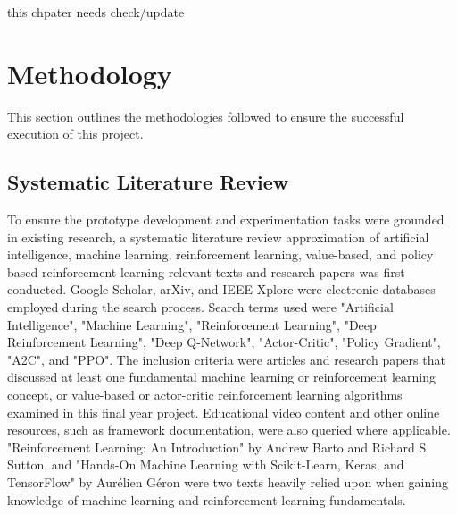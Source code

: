 




{\color{red}
this chpater needs check/update

\section{Methodology}
}
This section outlines the methodologies followed to ensure the successful
execution of this project.





\subsection{Systematic Literature Review}
To ensure the prototype development and experimentation tasks were grounded in existing research, a systematic literature review approximation of artificial intelligence, machine learning, reinforcement learning, value-based, and policy based reinforcement learning relevant texts and research papers was first conducted. Google Scholar, arXiv, and IEEE Xplore were electronic databases employed during the search process. Search terms used were "Artificial Intelligence", "Machine Learning", "Reinforcement Learning", "Deep Reinforcement Learning", "Deep Q-Network", "Actor-Critic", "Policy Gradient", "A2C", and "PPO". The inclusion criteria were articles and research papers that discussed at least one fundamental machine learning or reinforcement learning concept, or value-based or actor-critic reinforcement learning algorithms examined in this final year project. Educational video content and other online resources, such as framework documentation, were also queried where applicable. "Reinforcement Learning: An Introduction" by Andrew Barto and Richard S. Sutton, and "Hands-On Machine Learning with Scikit-Learn, Keras, and TensorFlow" by Aurélien Géron were two texts heavily relied upon when gaining knowledge of machine learning and reinforcement learning fundamentals.

